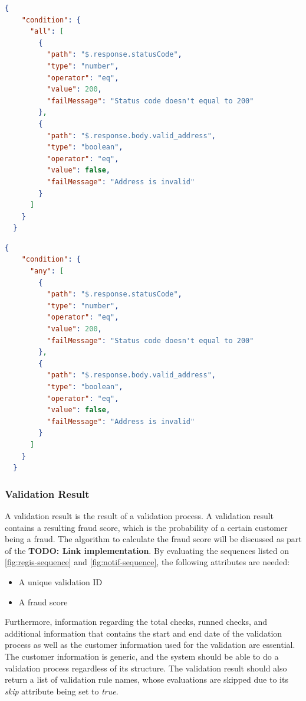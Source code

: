     \begin{lstlisting}[caption={Validation rule \textbf{condition} attribute example with ALL condition (JSON)}, language=json]
  {
    "condition": {
      "all": [
        {
          "path": "$.response.statusCode",
          "type": "number",
          "operator": "eq",
          "value": 200,
          "failMessage": "Status code doesn't equal to 200"
        },
        {
          "path": "$.response.body.valid_address",
          "type": "boolean",
          "operator": "eq",
          "value": false,
          "failMessage": "Address is invalid"
        }
      ]
    }
  }
    \end{lstlisting}

    \begin{lstlisting}[caption={Validation rule \textbf{condition} attribute example with ANY condition (JSON)}, language=json]
  {
    "condition": {
      "any": [
        {
          "path": "$.response.statusCode",
          "type": "number",
          "operator": "eq",
          "value": 200,
          "failMessage": "Status code doesn't equal to 200"
        },
        {
          "path": "$.response.body.valid_address",
          "type": "boolean",
          "operator": "eq",
          "value": false,
          "failMessage": "Address is invalid"
        }
      ]
    }
  }
    \end{lstlisting}

  \subsubsection{Validation Result}

    A validation result is the result of a validation process. A validation result contains a resulting fraud score, which is the probability of a certain customer being a fraud. The algorithm to calculate the fraud score will be discussed as part of the \textbf{TODO: Link implementation}.
    By evaluating the sequences listed on \autoref{fig:regis-sequence} and \autoref{fig:notif-sequence}, the following attributes are needed:

    \begin{itemize}
      \item A unique validation ID
      \item A fraud score 
    \end{itemize}

    Furthermore, information regarding the total checks, runned checks, and additional information that contains the start and end date of the validation process as well as the customer information used for the validation are essential. The customer information is generic, and the system should be able to do a validation process regardless of its structure. The validation result should also return a list of validation rule names, whose evaluations are skipped due to its \emph{skip} attribute being set to \emph{true}.

